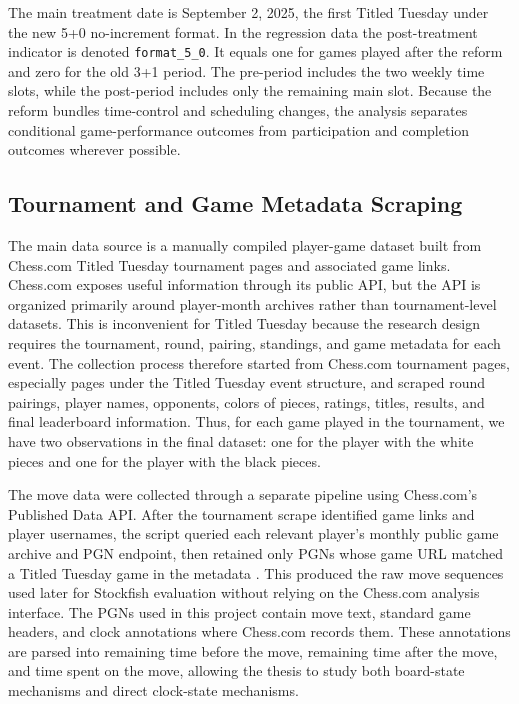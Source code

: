 The main treatment date is September 2, 2025, the first Titled Tuesday under the new 5+0 no-increment format. In the regression data the post-treatment indicator is denoted \texttt{format\_5\_0}. It equals one for games played after the reform and zero for the old 3+1 period. The pre-period includes the two weekly time slots, while the post-period includes only the remaining main slot. Because the reform bundles time-control and scheduling changes, the analysis separates conditional game-performance outcomes from participation and completion outcomes wherever possible.

\subsection{Tournament and Game Metadata Scraping}

The main data source is a manually compiled player-game dataset built from Chess.com Titled Tuesday tournament pages and associated game links. Chess.com exposes useful information through its public API, but the API is organized primarily around player-month archives rather than tournament-level datasets. This is inconvenient for Titled Tuesday because the research design requires the tournament, round, pairing, standings, and game metadata for each event. The collection process therefore started from Chess.com tournament pages, especially pages under the Titled Tuesday event structure, and scraped round pairings, player names, opponents, colors of pieces, ratings, titles, results, and final leaderboard information. Thus, for each game played in the tournament, we have two observations in the final dataset: one for the player with the white pieces and one for the player with the black pieces.

The move data were collected through a separate pipeline using Chess.com's Published Data API. After the tournament scrape identified game links and player usernames, the script queried each relevant player's monthly public game archive and PGN endpoint, then retained only PGNs whose game URL matched a Titled Tuesday game in the metadata \citep{chesscom_pubapi,chesscom_pgn_api}. This produced the raw move sequences used later for Stockfish evaluation without relying on the Chess.com analysis interface. The PGNs used in this project contain move text, standard game headers, and clock annotations where Chess.com records them. These annotations are parsed into remaining time before the move, remaining time after the move, and time spent on the move, allowing the thesis to study both board-state mechanisms and direct clock-state mechanisms.


